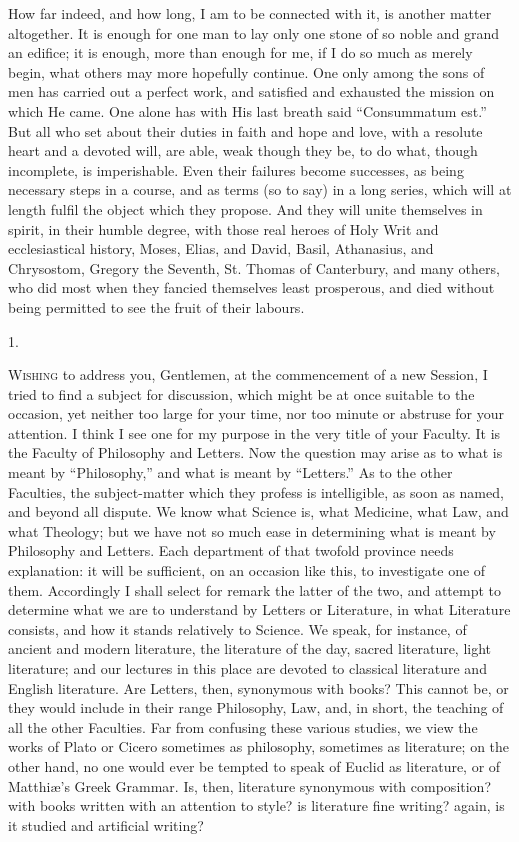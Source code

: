 How far indeed, and how long, I am to be connected with it, is
another matter altogether. It is enough for one man to lay only one
stone of so noble and grand an edifice; it is enough, more than enough
for me, if I do so much as merely begin, what others may more
hopefully continue. One only among the sons of men has carried out a
perfect work, and satisfied and exhausted the mission on which He
came. One alone has with His last breath said ``Consummatum
est.'' But all who set about their duties in faith and hope and
love, with a resolute heart and a devoted will, are able, weak though
they be, to do what, though incomplete, is imperishable. Even their
failures become successes, as being necessary steps in a course, and
as terms (so to say) in a long series, which will at length fulfil the
object which they propose. And they will unite themselves in spirit,
in their humble degree, with those real heroes of Holy Writ and
ecclesiastical history, Moses, Elias, and David, Basil, Athanasius,
and Chrysostom, Gregory the Seventh, St. Thomas of Canterbury, and
many others, who did most when they fancied themselves least
prosperous, and died without being permitted to see the fruit of their
labours.



1.

W\textsc{ishing} to address you, Gentlemen, at the commencement of a
new Session, I tried to find a subject for discussion, which might be
at once suitable to the occasion, yet neither too large for your time,
nor too minute or abstruse for your attention. I think I see one for
my purpose in the very title of your Faculty. It is the Faculty of
Philosophy and Letters. Now the question may arise as to what is meant
by ``Philosophy,'' and what is meant by ``Letters.''
As to the other Faculties, the subject-matter which they profess is
intelligible, as soon as named, and beyond all dispute. We know what
Science is, what Medicine, what Law, and what Theology; but we have
not so much ease in determining what is meant by Philosophy and
Letters. Each department of that twofold province needs explanation:
it will be sufficient, on an occasion like this, to investigate one of
them. Accordingly I shall select for remark the latter of the two, and
attempt to determine what we are to understand by Letters or
Literature, in what Literature consists, and how it stands
relatively to Science. We speak, for instance, of ancient and
modern literature, the literature of the day, sacred literature, light
literature; and our lectures in this place are devoted to classical
literature and English literature. Are Letters, then, synonymous with
books? This cannot be, or they would include in their range
Philosophy, Law, and, in short, the teaching of all the other
Faculties. Far from confusing these various studies, we view the works
of Plato or Cicero sometimes as philosophy, sometimes as literature;
on the other hand, no one would ever be tempted to speak of Euclid as
literature, or of Matthiæ's Greek Grammar. Is, then, literature
synonymous with composition? with books written with an attention to
style? is literature fine writing? again, is it studied and artificial
writing?

